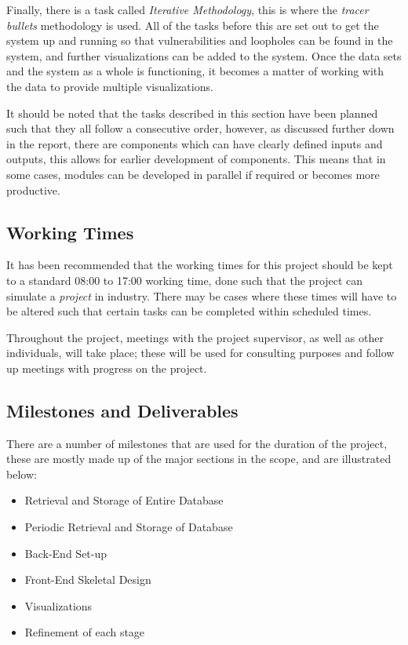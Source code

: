 \documentclass[12pt,onecolumn]{IEEEtran}
\begin{document}
Finally, there is a task called \textit{Iterative Methodology}, this is where the \textit{tracer bullets} methodology is used. All of the tasks before this are set out to get the system up and running so that vulnerabilities and loopholes can be found in the system, and further visualizations can be added to the system. Once the data sets and the system as a whole is functioning, it becomes a matter of working with the data to provide multiple visualizations.

It should be noted that the tasks described in this section have been planned such that they all follow a consecutive order, however, as discussed further down in the report, there are components which can have clearly defined inputs and outputs, this allows for earlier development of components. This means that in some cases, modules can be developed in parallel if required or becomes more productive.

\subsection{Working Times} \label{sec:WorkingTimes}
It has been recommended that the working times for this project should be kept to a standard 08:00 to 17:00 working time, done such that the project can simulate a \textit{project} in industry.
There may be cases where these times will have to be altered such that certain tasks can be completed within scheduled times.

Throughout the project, meetings with the project supervisor, as well as other individuals, will take place; these will be used for consulting purposes and follow up meetings with progress on the project.


\subsection{Milestones and Deliverables} \label{sec:MilestonesAndDeliverables}
There are a number of milestones that are used for the duration of the project, these are mostly made up of the major sections in the scope, and are illustrated below:

\begin{itemize}
    \item Retrieval and Storage of Entire Database
    \item Periodic Retrieval and Storage of Database
    \item Back-End Set-up
    \item Front-End Skeletal Design
    \item Visualizations
    \item Refinement of each stage
\end{itemize}
\end{document}
